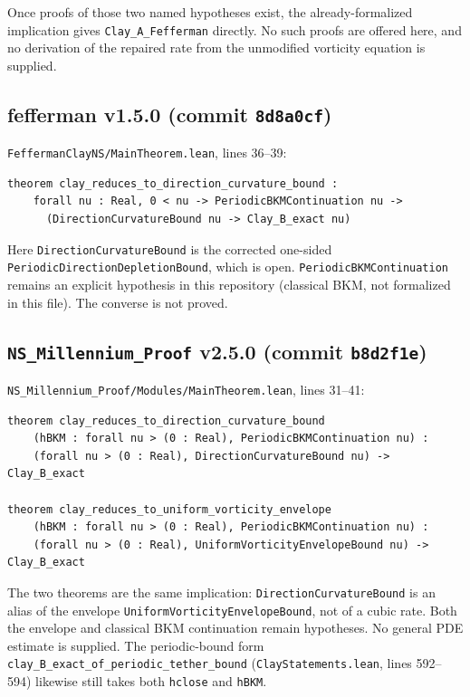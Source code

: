 \documentclass[11pt]{article}
\theoremstyle{plain}
\theoremstyle{definition}
\theoremstyle{remark}
\newcommand{\fefsha}{8d8a0cf}
\newcommand{\nssha}{b8d2f1e}
\begin{document}
Once proofs of those two named hypotheses exist, the already-formalized implication gives \texttt{Clay\_A\_Fefferman} directly. No such proofs are offered here, and no derivation of the repaired rate from the unmodified vorticity equation is supplied.

\subsection{fefferman v1.5.0 (commit \texttt{\fefsha})}

\texttt{FeffermanClayNS/\hspace{0pt}MainTheorem.\hspace{0pt}lean}, lines 36--39:
\begin{lstlisting}
theorem clay_reduces_to_direction_curvature_bound :
    forall nu : Real, 0 < nu -> PeriodicBKMContinuation nu ->
      (DirectionCurvatureBound nu -> Clay_B_exact nu)
\end{lstlisting}
Here \texttt{DirectionCurvatureBound} is the corrected one-sided \texttt{PeriodicDirectionDepletionBound}, which is open. \texttt{PeriodicBKMContinuation} remains an explicit hypothesis in this repository (classical BKM, not formalized in this file). The converse is not proved.

\subsection[NS\_Millennium\_Proof v2.5.0 (commit b8d2f1e)]{\texttt{NS\_Millennium\_Proof} v2.5.0 (commit \texttt{\nssha})}

\texttt{NS\_\hspace{0pt}Millennium\_\hspace{0pt}Proof/\hspace{0pt}Modules/\hspace{0pt}MainTheorem.\hspace{0pt}lean}, lines 31--41:
\begin{lstlisting}
theorem clay_reduces_to_direction_curvature_bound
    (hBKM : forall nu > (0 : Real), PeriodicBKMContinuation nu) :
    (forall nu > (0 : Real), DirectionCurvatureBound nu) -> Clay_B_exact

theorem clay_reduces_to_uniform_vorticity_envelope
    (hBKM : forall nu > (0 : Real), PeriodicBKMContinuation nu) :
    (forall nu > (0 : Real), UniformVorticityEnvelopeBound nu) -> Clay_B_exact
\end{lstlisting}
The two theorems are the same implication: \texttt{DirectionCurvatureBound} is an alias of the envelope \texttt{UniformVorticityEnvelopeBound}, not of a cubic rate. Both the envelope and classical BKM continuation remain hypotheses. No general PDE estimate is supplied. The periodic-bound form \texttt{clay\_\hspace{0pt}B\_\hspace{0pt}exact\_\hspace{0pt}of\_\hspace{0pt}periodic\_\hspace{0pt}tether\_\hspace{0pt}bound} (\texttt{ClayStatements.\hspace{0pt}lean}, lines 592--594) likewise still takes both \texttt{hclose} and \texttt{hBKM}.
\end{document}
